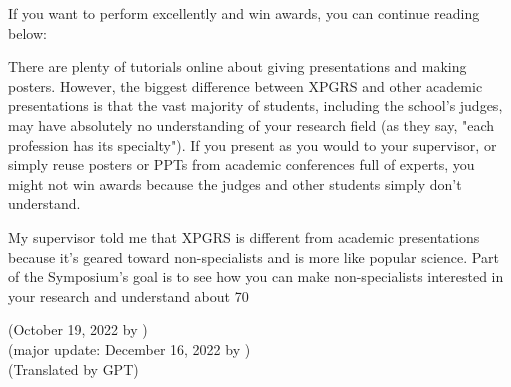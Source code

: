 If you want to perform excellently and win awards, you can continue reading below:

There are plenty of tutorials online about giving presentations and making posters. However, the biggest difference between XPGRS and other academic presentations is that the vast majority of students, including the school's judges, may have absolutely no understanding of your research field (as they say, "each profession has its specialty"). If you present as you would to your supervisor, or simply reuse posters or PPTs from academic conferences full of experts, you might not win awards because the judges and other students simply don't understand.

My supervisor told me that XPGRS is different from academic presentations because it's geared toward non-specialists and is more like popular science. Part of the Symposium's goal is to see how you can make non-specialists interested in your research and understand about 70%

\begin{flushright}
(October 19, 2022 by \Wu) \\
(major update: December 16, 2022 by \Wu) \\
(Translated by GPT)
\end{flushright}